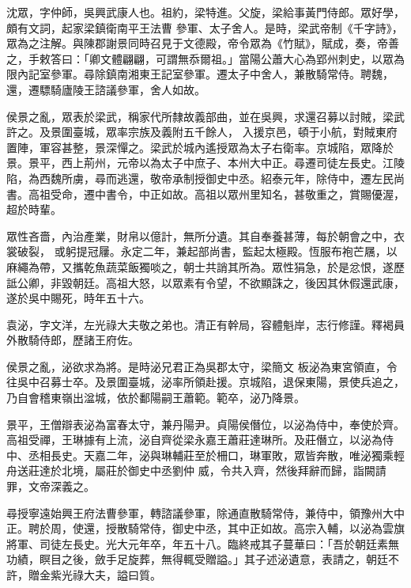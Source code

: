 
\begin{pinyinscope}

 沈眾，字仲師，吳興武康人也。祖約，梁特進。父旋，梁給事黃門侍郎。眾好學，頗有文詞，起家梁鎮衛南平王法曹
 參軍、太子舍人。是時，梁武帝制《千字詩》，眾為之注解。與陳郡謝景同時召見于文德殿，帝令眾為《竹賦》，賦成，奏，帝善之，手敕答曰：「卿文體翩翩，可謂無忝爾祖。」當陽公蕭大心為郢州刺史，以眾為限內記室參軍。尋除鎮南湘東王記室參軍。遷太子中舍人，兼散騎常侍。聘魏，還，遷驃騎廬陵王諮議參軍，舍人如故。



 侯景之亂，眾表於梁武，稱家代所隸故義部曲，並在吳興，求還召募以討賊，梁武許之。及景圍臺城，眾率宗族及義附五千餘人，
 入援京邑，頓于小航，對賊東府置陣，軍容甚整，景深憚之。梁武於城內遙授眾為太子右衛率。京城陷，眾降於景。景平，西上荊州，元帝以為太子中庶子、本州大中正。尋遷司徒左長史。江陵陷，為西魏所虜，尋而逃還，敬帝承制授御史中丞。紹泰元年，除侍中，遷左民尚書。高祖受命，遷中書令，中正如故。高祖以眾州里知名，甚敬重之，賞賜優渥，超於時輩。



 眾性吝嗇，內治產業，財帛以億計，無所分遺。其自奉養甚薄，每於朝會之中，衣裳破裂，
 或躬提冠屨。永定二年，兼起部尚書，監起太極殿。恆服布袍芒屩，以麻繩為帶，又攜乾魚蔬菜飯獨啖之，朝士共誚其所為。眾性狷急，於是忿恨，遂歷詆公卿，非毀朝廷。高祖大怒，以眾素有令望，不欲顯誅之，後因其休假還武康，遂於吳中賜死，時年五十六。



 袁泌，字文洋，左光祿大夫敬之弟也。清正有幹局，容體魁岸，志行修謹。釋褐員外散騎侍郎，歷諸王府佐。



 侯景之亂，泌欲求為將。是時泌兄君正為吳郡太守，梁簡文
 板泌為東宮領直，令往吳中召募士卒。及景圍臺城，泌率所領赴援。京城陷，退保東陽，景使兵追之，乃自會稽東嶺出湓城，依於鄱陽嗣王蕭範。範卒，泌乃降景。



 景平，王僧辯表泌為富春太守，兼丹陽尹。貞陽侯僭位，以泌為侍中，奉使於齊。高祖受禪，王琳據有上流，泌自齊從梁永嘉王蕭莊達琳所。及莊僭立，以泌為侍中、丞相長史。天嘉二年，泌與琳輔莊至於柵口，琳軍敗，眾皆奔散，唯泌獨乘輕舟送莊達於北境，屬莊於御史中丞劉仲
 威，令共入齊，然後拜辭而歸，詣闕請罪，文帝深義之。



 尋授寧遠始興王府法曹參軍，轉諮議參軍，除通直散騎常侍，兼侍中，領豫州大中正。聘於周，使還，授散騎常侍，御史中丞，其中正如故。高宗入輔，以泌為雲旗將軍、司徒左長史。光大元年卒，年五十八。臨終戒其子蔓華曰：「吾於朝廷素無功績，瞑目之後，斂手足旋葬，無得輒受贈謚。」其子述泌遺意，表請之，朝廷不許，贈金紫光祿大夫，謚曰質。




\end{pinyinscope}
